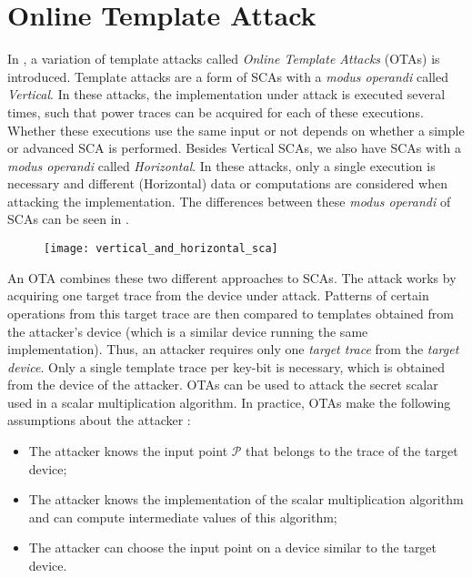 \section{Online Template Attack}  \label{sec: Online Template Attack}
In \cite{batina2014online}, a variation of template attacks called \emph{Online Template Attacks} (OTAs) is introduced.
Template attacks are a form of SCAs with a \emph{modus operandi} called \emph{Vertical}.
In these attacks, the implementation under attack is executed several times, such that power traces can be acquired for each of these executions.
Whether these executions use the same input or not depends on whether a simple or advanced SCA is performed.
Besides Vertical SCAs, we also have SCAs with a \emph{modus operandi} called \emph{Horizontal}.
In these attacks, only a single execution is necessary and different (Horizontal) data or computations are considered when attacking the implementation.
The differences between these \emph{modus operandi} of SCAs can be seen in .
%
\begin{figure}
	\centering
	\texttt{[image: vertical\_and\_horizontal\_sca]}
	\label{fig: vertical_and_horizontal_sca}
\end{figure}
%
An OTA combines these two different approaches to SCAs. 
The attack works by acquiring one target trace from the device under attack.
Patterns of certain operations from this target trace are then compared to templates obtained from the attacker's device (which is a similar device running the same implementation).
Thus, an attacker requires only one \emph{target trace} from the \emph{target device}.
Only a single template trace per key-bit is necessary, which is obtained from the device of the attacker.
OTAs can be used to attack the secret scalar used in a scalar multiplication algorithm.
In practice, OTAs make the following assumptions about the attacker \cite{batina2014online, dugardin2016dismantling}:
%
\begin{itemize}
	\item The attacker knows the input point $\mathcal{P}$ that belongs to the trace of the target device;
	\item The attacker knows the implementation of the scalar multiplication algorithm and can compute intermediate values of this algorithm;
	\item The attacker can choose the input point on a device similar to the target device.
\end{itemize}

